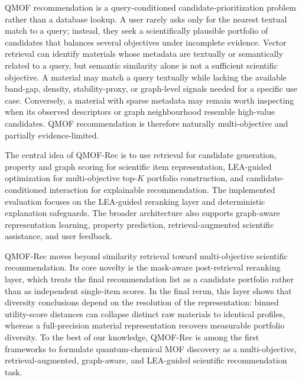\documentclass[12pt,a4paper]{article}
\begin{document}
QMOF recommendation is a query-conditioned candidate-prioritization problem rather than a database lookup. A user rarely asks only for the nearest textual match to a query; instead, they seek a scientifically plausible portfolio of candidates that balances several objectives under incomplete evidence. Vector retrieval can identify materials whose metadata are textually or semantically related to a query, but semantic similarity alone is not a sufficient scientific objective. A material may match a query textually while lacking the available band-gap, density, stability-proxy, or graph-level signals needed for a specific use case. Conversely, a material with sparse metadata may remain worth inspecting when its observed descriptors or graph neighbourhood resemble high-value candidates. QMOF recommendation is therefore naturally multi-objective and partially evidence-limited.

The central idea of QMOF-Rec is to use retrieval for candidate generation, property and graph scoring for scientific item representation, LEA-guided optimization for multi-objective top-$K$ portfolio construction, and candidate-conditioned interaction for explainable recommendation. The implemented evaluation focuses on the LEA-guided reranking layer and deterministic explanation safeguards. The broader architecture also supports graph-aware representation learning, property prediction, retrieval-augmented scientific assistance, and user feedback.

QMOF-Rec moves beyond similarity retrieval toward multi-objective scientific recommendation. Its core novelty is the mask-aware post-retrieval reranking layer, which treats the final recommendation list as a candidate portfolio rather than as independent single-item scores. In the final rerun, this layer shows that diversity conclusions depend on the resolution of the representation: binned utility-score distances can collapse distinct raw materials to identical profiles, whereas a full-precision material representation recovers measurable portfolio diversity. To the best of our knowledge, QMOF-Rec is among the first frameworks to formulate quantum-chemical MOF discovery as a multi-objective, retrieval-augmented, graph-aware, and LEA-guided scientific recommendation task.
\end{document}

